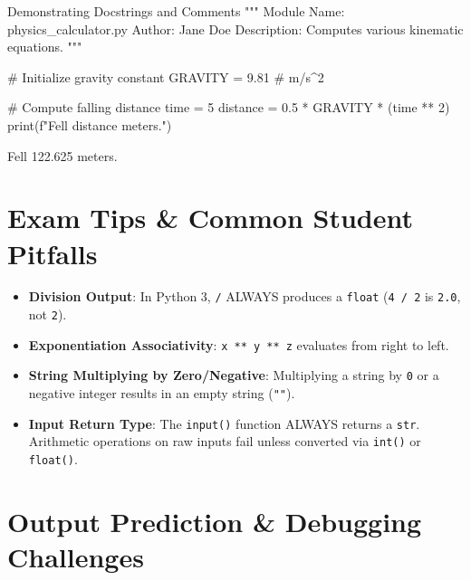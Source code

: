 \begin{pythoncode}{Demonstrating Docstrings and Comments}
"""
Module Name: physics_calculator.py
Author: Jane Doe
Description: Computes various kinematic equations.
"""

# Initialize gravity constant
GRAVITY = 9.81  # m/s^2

# Compute falling distance
time = 5
distance = 0.5 * GRAVITY * (time ** 2)
print(f"Fell {distance} meters.")
\end{pythoncode}

\begin{outputbox}
Fell 122.625 meters.
\end{outputbox}


\section{Exam Tips \& Common Student Pitfalls}

\begin{examtip}
\begin{itemize}[leftmargin=1.5em]
    \item \textbf{Division Output}: In Python 3, \texttt{/} ALWAYS produces a \texttt{float} (\texttt{4 / 2} is \texttt{2.0}, not \texttt{2}).
    \item \textbf{Exponentiation Associativity}: \texttt{x ** y ** z} evaluates from right to left.
    \item \textbf{String Multiplying by Zero/Negative}: Multiplying a string by \texttt{0} or a negative integer results in an empty string (\texttt{""}).
    \item \textbf{Input Return Type}: The \texttt{input()} function ALWAYS returns a \texttt{str}. Arithmetic operations on raw inputs fail unless converted via \texttt{int()} or \texttt{float()}.
\end{itemize}
\end{examtip}

\section{Output Prediction \& Debugging Challenges}

